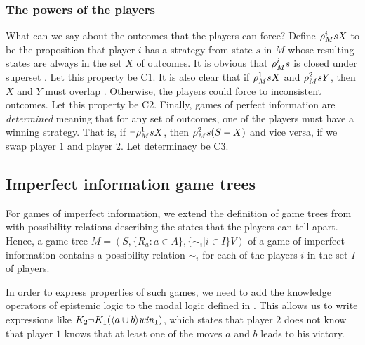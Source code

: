 \subsubsection*{The powers of the players}

What can we say about the outcomes that the players can force? Define $ \rho_{M}^{ i } s X $ to be the proposition that player $ i $ has a strategy from state $ s $ in $ M $ whose resulting states are always in the set $ X $ of outcomes. It is obvious that $ \rho_{M}^{ i } s $ is closed under superset \cite{benthem2001a}. Let this property be C1. It is also clear that if $ \rho_{M}^{ 1 } s X $ and $ \rho_{M}^{ 2 } s Y $, then $ X $ and $ Y $ must overlap \cite{benthem2001a}. Otherwise, the players could force to inconsistent outcomes. Let this property be C2. Finally, games of perfect information are \emph{determined} meaning that for any set of outcomes, one of the players must have a winning strategy. That is, if $ \neg \rho_{M}^{ 1 } s X $, then $ \rho_{M}^{ 2 } s (S - X) $ and vice versa, if we swap player $ 1 $ and player $ 2 $. Let determinacy be C3. 



\subsection{Imperfect information game trees}

For games of imperfect information, we extend the definition of game trees from  with possibility relations describing the states that the players can tell apart. Hence, a game tree $ M = (S, \{ R_{a} : a \in A \}, \{ \sim_{i} | i \in I \} V) $ of a game of imperfect information contains a possibility relation $ \sim_{i} $ for each of the players $ i $ in the set $ I $ of players.

In order to express properties of such games, we need to add the knowledge operators of epistemic logic to the modal logic defined in . This allows us to write expressions like $ K_{2} \neg K_{1} (\langle a \cup b \rangle \mathit{win}_{1}) $, which states that player $ 2 $ does not know that player $ 1 $ knows that at least one of the moves $ a $ and $ b $ leads to his victory.

